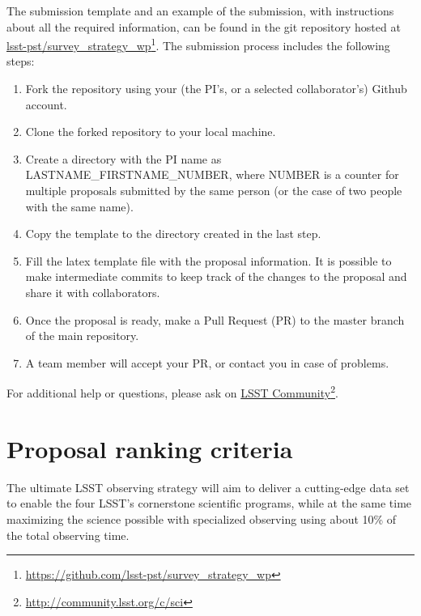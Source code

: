\documentclass[DM,lsstdraft,toc,usenatbib]{lsstdoc}
\begin{document}
The submission template and an example of the submission, with instructions about
all the required information, can be found in the git repository hosted at \href{https://github.com/lsst-pst/survey_strategy_wp}{lsst-pst/survey\_strategy\_wp}\footnote{\url{https://github.com/lsst-pst/survey_strategy_wp}}.
The submission process includes the following steps: 
%
\begin{enumerate}
\item Fork the repository using your (the PI's, or a selected collaborator's)  Github account.
\item Clone the forked repository to your local machine.
\item Create a directory with the PI name as LASTNAME\_FIRSTNAME\_NUMBER,
where NUMBER is a counter for multiple proposals submitted by the same person (or the case
of two people with the same name). 
\item Copy the template to the directory created in the last step.
\item Fill the latex template file with the proposal information. It is possible to make intermediate 
          commits to keep track of the changes to the proposal and share it with collaborators.
\item Once the proposal is ready, make a Pull Request (PR) to the master branch of the main repository. 
\item A team member will accept your PR, or contact you in case of problems. 
\end{enumerate}

For additional help or questions, please ask on \href{https://community.lsst.org/c/sci}{LSST Community}\footnote{\url{http://community.lsst.org/c/sci}}. 


\section{Proposal ranking criteria} 

The ultimate LSST observing strategy will aim to deliver a cutting-edge data set to enable
the four LSST's cornerstone scientific programs, while at the same time maximizing the 
science possible with specialized observing using about 10\% of the total observing time. 
\end{document}
